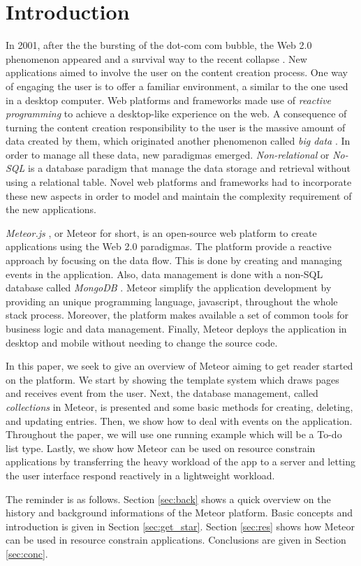 \section{Introduction}
\label{sec:intro}

In 2001, after the the bursting of the dot-com com bubble, the Web 2.0 phenomenon appeared and a survival way to the recent collapse \citep{oreilly2005}.
New applications aimed to involve the user on the content creation process.
One way of engaging the user is to offer a familiar environment, a similar to the one used in a desktop computer.
Web platforms and frameworks made use of \emph{reactive programming} \citep{reactive2014} to achieve a desktop-like experience on the web.
A consequence of turning the content creation responsibility to the user is the massive amount of data created by them, which originated another phenomenon called \emph{big data} \citep{SharmaTWGS14}.
In order to manage all these data, new paradigmas emerged.
\emph{Non-relational} or \emph{No-SQL} \citep{Strauch12} is a database paradigm that manage the data storage and retrieval without using a relational table.
Novel web platforms and frameworks had to incorporate these new aspects in order to model and maintain the complexity requirement of the new applications.

\emph{Meteor.js} \citep{meteor}, or Meteor for short, is an open-source web platform to create applications using the Web 2.0 paradigmas.
The platform provide a reactive approach by focusing on the data flow.
This is done by creating and managing events in the application.
Also, data management is done with a non-SQL database called \emph{MongoDB} \citep{mongo}.
Meteor simplify the application development by providing an unique programming language, javascript, throughout the whole stack process.
Moreover, the platform makes available a set of common tools for business logic and data management.
Finally, Meteor deploys the application in desktop and mobile without needing to change the source code.

In this paper, we seek to give an overview of Meteor aiming to get reader started on the platform.
We start by showing the template system which draws pages and receives event from the user.
Next, the database management, called \emph{collections} in Meteor, is presented and some basic methods for creating, deleting, and updating entries.
Then, we show how to deal with events on the application.
Throughout the paper, we will use one running example which will be a To-do list type.
Lastly, we show how Meteor can be used on resource constrain applications by transferring the heavy workload of the app to a server and letting the user interface respond reactively in a lightweight workload.

The reminder is as follows.
Section \ref{sec:back} shows a quick overview on the history and background informations of the Meteor platform.
Basic concepts and introduction is given in Section \ref{sec:get_star}.
Section \ref{sec:res} shows how Meteor can be used in resource constrain applications.
Conclusions are given in Section \ref{sec:conc}.